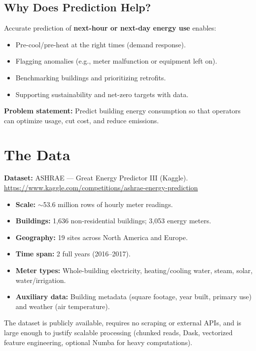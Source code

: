 \documentclass[11pt,a4paper]{article}
\begin{document}
\subsection{Why Does Prediction Help?}
Accurate prediction of \textbf{next-hour or next-day energy use} enables:
\begin{itemize}[noitemsep]
    \item Pre-cool/pre-heat at the right times (demand response).
    \item Flagging anomalies (e.g., meter malfunction or equipment left on).
    \item Benchmarking buildings and prioritizing retrofits.
    \item Supporting sustainability and net-zero targets with data.
\end{itemize}

\textbf{Problem statement:} Predict building energy consumption so that operators can optimize usage, cut cost, and reduce emissions.

\section{The Data}

\textbf{Dataset:} ASHRAE --- Great Energy Predictor III (Kaggle).\\
\url{https://www.kaggle.com/competitions/ashrae-energy-prediction}

\begin{itemize}[noitemsep]
    \item \textbf{Scale:} $\sim$53.6 million rows of hourly meter readings.
    \item \textbf{Buildings:} 1,636 non-residential buildings; 3,053 energy meters.
    \item \textbf{Geography:} 19 sites across North America and Europe.
    \item \textbf{Time span:} 2 full years (2016--2017).
    \item \textbf{Meter types:} Whole-building electricity, heating/cooling water, steam, solar, water/irrigation.
    \item \textbf{Auxiliary data:} Building metadata (square footage, year built, primary use) and weather (air temperature).
\end{itemize}

The dataset is publicly available, requires no scraping or external APIs, and is large enough to justify scalable processing (chunked reads, Dask, vectorized feature engineering, optional Numba for heavy computations).
\end{document}
